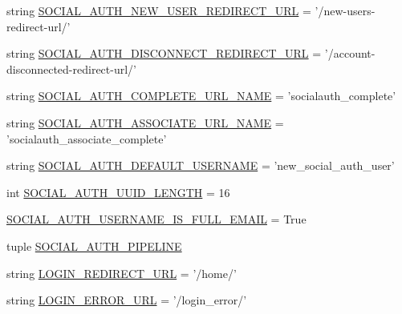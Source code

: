 \begin{DoxyCompactItemize}
\item 
string \hyperlink{namespaceleapkit_1_1settings_1_1base__settings__local_a3ce4d8da424087c41296017e21914f18}{S\-O\-C\-I\-A\-L\-\_\-\-A\-U\-T\-H\-\_\-\-N\-E\-W\-\_\-\-U\-S\-E\-R\-\_\-\-R\-E\-D\-I\-R\-E\-C\-T\-\_\-\-U\-R\-L} = '/new-\/users-\/redirect-\/url/'
\item 
string \hyperlink{namespaceleapkit_1_1settings_1_1base__settings__local_ae83d2d9f376a42dec7392c39a57ab7cc}{S\-O\-C\-I\-A\-L\-\_\-\-A\-U\-T\-H\-\_\-\-D\-I\-S\-C\-O\-N\-N\-E\-C\-T\-\_\-\-R\-E\-D\-I\-R\-E\-C\-T\-\_\-\-U\-R\-L} = '/account-\/disconnected-\/redirect-\/url/'
\item 
string \hyperlink{namespaceleapkit_1_1settings_1_1base__settings__local_a272045bd92e1392734dac90678adcbfd}{S\-O\-C\-I\-A\-L\-\_\-\-A\-U\-T\-H\-\_\-\-C\-O\-M\-P\-L\-E\-T\-E\-\_\-\-U\-R\-L\-\_\-\-N\-A\-M\-E} = 'socialauth\-\_\-complete'
\item 
string \hyperlink{namespaceleapkit_1_1settings_1_1base__settings__local_a320829254f4437f59a4d0f3d5cc0b118}{S\-O\-C\-I\-A\-L\-\_\-\-A\-U\-T\-H\-\_\-\-A\-S\-S\-O\-C\-I\-A\-T\-E\-\_\-\-U\-R\-L\-\_\-\-N\-A\-M\-E} = 'socialauth\-\_\-associate\-\_\-complete'
\item 
string \hyperlink{namespaceleapkit_1_1settings_1_1base__settings__local_a754cde6731c72481cb39b2fb7e026ebb}{S\-O\-C\-I\-A\-L\-\_\-\-A\-U\-T\-H\-\_\-\-D\-E\-F\-A\-U\-L\-T\-\_\-\-U\-S\-E\-R\-N\-A\-M\-E} = 'new\-\_\-social\-\_\-auth\-\_\-user'
\item 
int \hyperlink{namespaceleapkit_1_1settings_1_1base__settings__local_a5420a42d3381f8f7384f02c823aea498}{S\-O\-C\-I\-A\-L\-\_\-\-A\-U\-T\-H\-\_\-\-U\-U\-I\-D\-\_\-\-L\-E\-N\-G\-T\-H} = 16
\item 
\hyperlink{namespaceleapkit_1_1settings_1_1base__settings__local_ad902dedf00dd609cfb9ebd4bfd077421}{S\-O\-C\-I\-A\-L\-\_\-\-A\-U\-T\-H\-\_\-\-U\-S\-E\-R\-N\-A\-M\-E\-\_\-\-I\-S\-\_\-\-F\-U\-L\-L\-\_\-\-E\-M\-A\-I\-L} = True
\item 
tuple \hyperlink{namespaceleapkit_1_1settings_1_1base__settings__local_a1ab02638cc743189114f5087ff441adb}{S\-O\-C\-I\-A\-L\-\_\-\-A\-U\-T\-H\-\_\-\-P\-I\-P\-E\-L\-I\-N\-E}
\item 
string \hyperlink{namespaceleapkit_1_1settings_1_1base__settings__local_a1145e9d40c27048f04aa5d98a75a1b12}{L\-O\-G\-I\-N\-\_\-\-R\-E\-D\-I\-R\-E\-C\-T\-\_\-\-U\-R\-L} = '/home/'
\item 
string \hyperlink{namespaceleapkit_1_1settings_1_1base__settings__local_afca8abb60a287e145d0768d7ba83a36d}{L\-O\-G\-I\-N\-\_\-\-E\-R\-R\-O\-R\-\_\-\-U\-R\-L} = '/login\-\_\-error/'

\end{DoxyCompactItemize}
